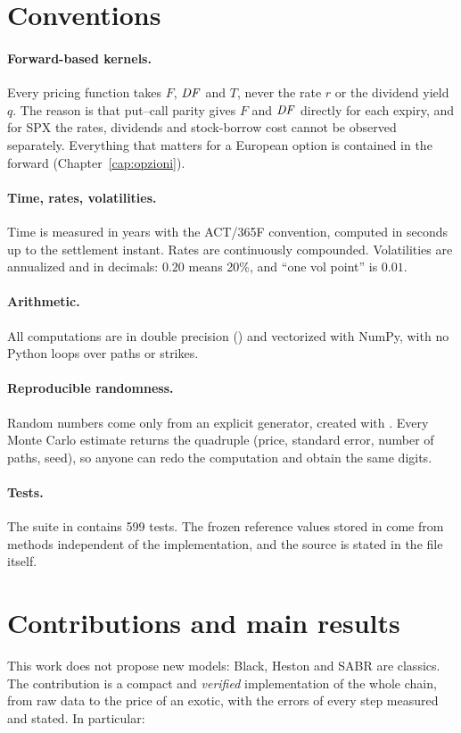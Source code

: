 \section*{Conventions}
\paragraph{Forward-based kernels.} Every pricing function takes $F$, $\mathit{DF}$ and $T$, never the rate $r$ or the
dividend yield $q$. The reason is that put--call parity gives $F$ and $\mathit{DF}$ directly for each expiry, and for SPX the
rates, dividends and stock-borrow cost cannot be observed separately. Everything that matters for a European option
is contained in the forward (Chapter~\ref{cap:opzioni}).

\paragraph{Time, rates, volatilities.} Time is measured in years with the ACT/365F convention, computed in seconds up
to the settlement instant. Rates are continuously compounded. Volatilities are annualized and in decimals: $0.20$
means 20\%, and ``one vol point'' is $0.01$.

\paragraph{Arithmetic.} All computations are in double precision () and vectorized with NumPy, with no
Python loops over paths or strikes.

\paragraph{Reproducible randomness.} Random numbers come only from an explicit generator, created with
. Every Monte Carlo estimate returns the quadruple (price, standard error, number
of paths, seed), so anyone can redo the computation and obtain the same digits.

\paragraph{Tests.} The  suite in  contains 599 tests. The frozen reference values stored in
 come from methods independent of the implementation, and the source is stated in the file
itself.

\section*{Contributions and main results}
This work does not propose new models: Black, Heston and SABR are classics. The contribution is a compact and
\emph{verified} implementation of the whole chain, from raw data to the price of an exotic, with the errors of every
step measured and stated. In particular:

